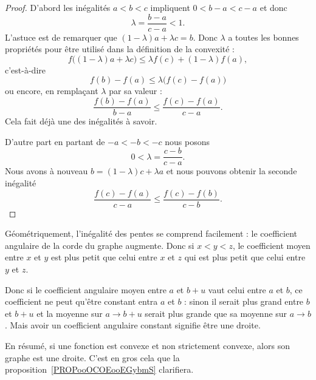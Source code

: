 \begin{proof}
	D'abord les inégalités \( a<b<c\) impliquent \( 0<b-a<c-a\) et donc
	\begin{equation}
		\lambda=\frac{ b-a }{ c-a }<1.
	\end{equation}
	L'astuce est de remarquer que \( (1-\lambda)a+\lambda c=b\). Donc \( \lambda\) a toutes les bonnes propriétés pour être utilisé dans la définition de la convexité :
	\begin{equation}
		f\big( (1-\lambda)a+\lambda c \big)\leq \lambda f(c)+(1-\lambda)f(a),
	\end{equation}
	c'est-à-dire
	\begin{equation}
		f(b)-f(a)\leq \lambda\big( f(c)-f(a) \big)
	\end{equation}
	ou encore, en remplaçant \( \lambda\) par sa valeur :
	\begin{equation}
		\frac{ f(b)-f(a) }{ b-a }\leq \frac{ f(c)-f(a) }{ c-a }.
	\end{equation}
	Cela fait déjà une des inégalités à savoir.

	D'autre part en partant de \( -a<-b<-c\) nous posons
	\begin{equation}
		0<\lambda=\frac{ c-b }{ c-a }.
	\end{equation}
	Nous avons à nouveau \( b=(1-\lambda)c+\lambda a\) et nous pouvons obtenir la seconde inégalité
	\begin{equation}
		\frac{ f(c)-f(a) }{ c-a }\leq \frac{ f(c)-f(b) }{ c-b }.
	\end{equation}
\end{proof}

Géométriquement, l'inégalité des pentes se comprend facilement : le coefficient angulaire de la corde du graphe augmente. Donc si \( x<y<z\), le coefficient moyen entre \( x\) et \( y\) est plus petit que celui entre \( x\) et \( z\) qui est plus petit que celui entre \( y\) et \( z\).

Donc si le coefficient angulaire moyen entre \( a\) et \( b+u\) vaut celui entre \( a\) et \( b\), ce coefficient ne peut qu'être constant entra \( a\) et \( b\) : sinon il serait plus grand entre \( b\) et \( b+u\) et la moyenne sur \( a\to b+u\) serait plus grande que sa moyenne sur \( a\to b\). Mais avoir un coefficient angulaire constant signifie être une droite.

En résumé, si une fonction est convexe et non strictement convexe, alors son graphe est une droite. C'est en gros cela que la proposition~\ref{PROPooOCOEooEGybmS} clarifiera.

